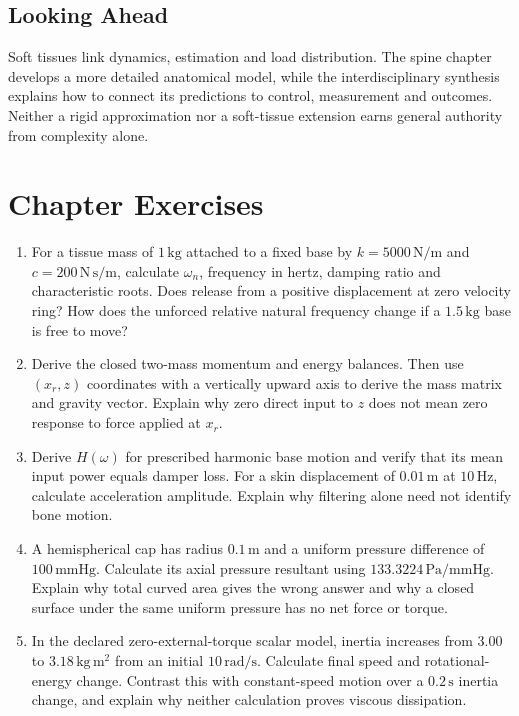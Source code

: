 \subsection{Looking Ahead}

Soft tissues link dynamics, estimation and load distribution. The spine chapter develops a more detailed anatomical model, while the interdisciplinary synthesis explains how to connect its predictions to control, measurement and outcomes. Neither a rigid approximation nor a soft-tissue extension earns general authority from complexity alone.

\section{Chapter Exercises}
\label{ex:ch20_exercises}
\begin{enumerate}[leftmargin=*]
\item For a tissue mass of $1\,\mathrm{kg}$ attached to a fixed base by $k=5000\,\mathrm{N/m}$ and $c=200\,\mathrm{N\,s/m}$, calculate $\omega_n$, frequency in hertz, damping ratio and characteristic roots. Does release from a positive displacement at zero velocity ring? How does the unforced relative natural frequency change if a $1.5\,\mathrm{kg}$ base is free to move?
\item Derive the closed two-mass momentum and energy balances. Then use $(x_r,z)$ coordinates with a vertically upward axis to derive the mass matrix and gravity vector. Explain why zero direct input to $z$ does not mean zero response to force applied at $x_r$.
\item Derive $H(\omega)$ for prescribed harmonic base motion and verify that its mean input power equals damper loss. For a skin displacement of $0.01\,\mathrm m$ at $10\,\mathrm{Hz}$, calculate acceleration amplitude. Explain why filtering alone need not identify bone motion.
\item A hemispherical cap has radius $0.1\,\mathrm m$ and a uniform pressure difference of $100\,\mathrm{mmHg}$. Calculate its axial pressure resultant using $133.3224\,\mathrm{Pa/mmHg}$. Explain why total curved area gives the wrong answer and why a closed surface under the same uniform pressure has no net force or torque.
\item In the declared zero-external-torque scalar model, inertia increases from $3.00$ to $3.18\,\mathrm{kg\,m^2}$ from an initial $10\,\mathrm{rad/s}$. Calculate final speed and rotational-energy change. Contrast this with constant-speed motion over a $0.2\,\mathrm s$ inertia change, and explain why neither calculation proves viscous dissipation.

\end{enumerate}
